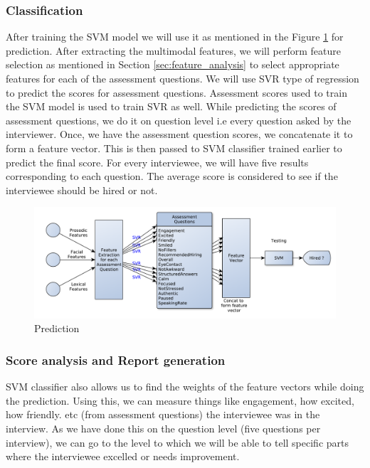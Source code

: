 \documentclass[11pt]{article}
\begin{document}
\subsubsection{Classification}
After training the SVM model we will use it as mentioned in the Figure \ref{fig:methodology} for prediction. After extracting the multimodal features, we will perform feature selection as mentioned in Section \ref{sec:feature_analysis} to select appropriate features for each of the assessment questions. We will use SVR type of regression to predict the scores for assessment questions. Assessment scores used to train the SVM model is used to train SVR as well. While predicting the scores of assessment questions, we do it on question level i.e every question asked by the interviewer. Once, we have the assessment question scores, we concatenate it to form a feature vector. This is then passed to SVM classifier trained earlier to predict the final score. For every interviewee, we will have five results corresponding to each question. The average score is considered to see if the interviewee should be hired or not.

\begin{figure}[h!]
\begin{center}
\includegraphics[width=1\columnwidth]{figures/methodology.pdf}
\caption{Prediction}
\label{fig:methodology}
\end{center}
\end{figure}

\subsubsection{Score analysis and Report generation}
SVM classifier also allows us to find the weights of the feature vectors while doing the prediction. Using this, we can measure things like engagement, how excited, how friendly. etc (from assessment questions) the interviewee was in the interview. As we have done this on the question level (five questions per interview), we can go to the level to which we will be able to tell specific parts where the interviewee excelled or needs improvement.
\end{document}
